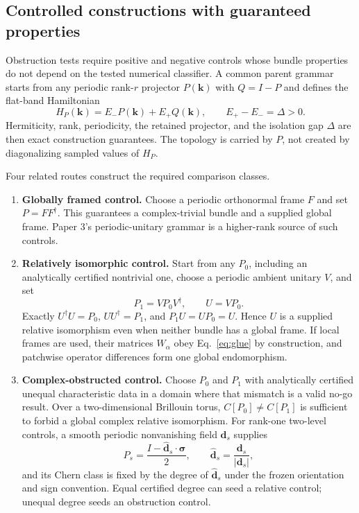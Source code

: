 \documentclass[11pt]{article}
\newenvironment{prospective}{\color{prospectivered}}{}
\begin{document}
\begin{prospective}
\subsection{Controlled constructions with guaranteed properties}
Obstruction tests require positive and negative controls whose bundle properties do not
depend on the tested numerical classifier. A common parent grammar starts from any
periodic rank-$r$ projector $P(\mathbf k)$ with $Q=I-P$ and defines the flat-band
Hamiltonian
\begin{equation}
 H_P(\mathbf k)=E_-P(\mathbf k)+E_+Q(\mathbf k),
 \qquad E_+-E_-=\Delta>0.
 \label{eq:flat-projector-parent}
\end{equation}
Hermiticity, rank, periodicity, the retained projector, and the isolation gap $\Delta$
are then exact construction guarantees. The topology is carried by $P$, not created by
diagonalizing sampled values of $H_P$.

Four related routes construct the required comparison classes.
\begin{enumerate}
 \item \textbf{Globally framed control.} Choose a periodic orthonormal frame $F$ and set
 $P=FF^\dagger$. This guarantees a complex-trivial bundle and a supplied global frame.
 Paper 3's periodic-unitary grammar is a higher-rank source of such controls.

 \item \textbf{Relatively isomorphic control.} Start from any $P_0$, including an
 analytically certified nontrivial one, choose a periodic ambient unitary $V$, and set
 \begin{equation}
  P_1=VP_0V^\dagger,
  \qquad U=VP_0.
  \label{eq:constructed-relative-isomorphism}
 \end{equation}
 Exactly $U^\dagger U=P_0$, $UU^\dagger=P_1$, and $P_1U=UP_0=U$. Hence $U$ is a
 supplied relative isomorphism even when neither bundle has a global frame. If local
 frames are used, their matrices $W_\alpha$ obey Eq.~\eqref{eq:glue} by construction,
 and patchwise operator differences form one global endomorphism.

 \item \textbf{Complex-obstructed control.} Choose $P_0$ and $P_1$ with analytically
 certified unequal characteristic data in a domain where that mismatch is a valid no-go
 result. Over a two-dimensional Brillouin torus, $C[P_0]\ne C[P_1]$ is sufficient to
 forbid a global complex relative isomorphism. For rank-one two-level controls, a smooth
 periodic nonvanishing field $\mathbf d_s$ supplies
 \begin{equation}
  P_s=\frac{I-\widehat{\mathbf d}_s\cdot\boldsymbol\sigma}{2},
  \qquad
  \widehat{\mathbf d}_s=\frac{\mathbf d_s}{|\mathbf d_s|},
  \label{eq:constructed-two-level-projector}
 \end{equation}
 and its Chern class is fixed by the degree of $\widehat{\mathbf d}_s$ under the frozen
 orientation and sign convention. Equal certified degree can seed a relative control;
 unequal degree seeds an obstruction control.


\end{enumerate}
\end{prospective}
\end{document}
